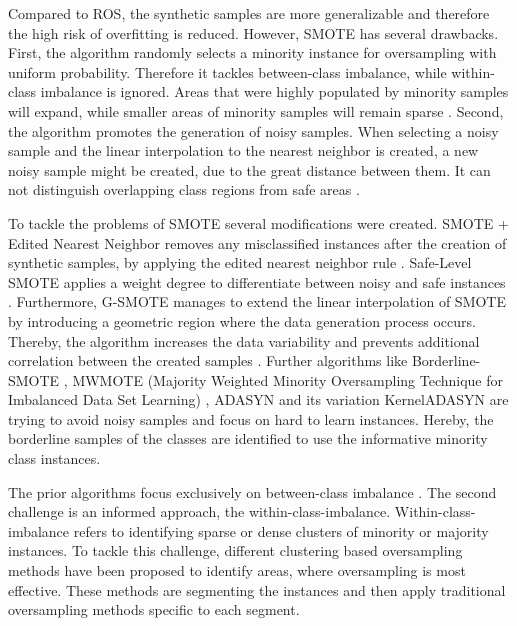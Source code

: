 \documentclass[parskip=full]{scrartcl}
\begin{document}
Compared to ROS, the synthetic samples are more generalizable and therefore the
high risk of overfitting is reduced. However, SMOTE has several drawbacks.
First, the algorithm randomly selects a minority instance for oversampling with
uniform probability. Therefore it tackles between-class imbalance, while
within-class imbalance is ignored. Areas that were highly populated by minority
samples will expand, while smaller areas of minority samples will remain sparse
\cite{Prati2004}. Second, the algorithm promotes the generation of noisy
samples. When selecting a noisy sample and the linear interpolation to the
nearest neighbor is created, a new noisy sample might be created, due to the
great distance between them. It can not distinguish overlapping class regions
from safe areas \cite{Bunkhumpornpat2009}. 

To tackle the problems of SMOTE several modifications were created. SMOTE +
Edited Nearest Neighbor removes any misclassified instances after the creation
of synthetic samples, by applying the edited nearest neighbor rule
\cite{Batista2004}. Safe-Level SMOTE applies a weight degree to differentiate
between noisy and safe instances \cite{Bunkhumpornpat2009}. Furthermore, G-SMOTE
manages to extend the linear interpolation of SMOTE by introducing a geometric
region where the data generation process occurs. Thereby, the algorithm
increases the data variability and prevents additional correlation between the
created samples \cite{Douzas2019}. Further algorithms like Borderline-SMOTE
\cite{Han2005}, MWMOTE (Majority Weighted Minority Oversampling Technique for
Imbalanced Data Set Learning) \cite{Barua2014}, ADASYN and its variation
KernelADASYN \cite{Tang2015} are trying to avoid noisy samples and focus on hard
to learn instances. Hereby, the borderline samples of the classes are identified
to use the informative minority class instances.

The prior algorithms focus exclusively on between-class imbalance
\cite{Nekooeimehr2016}. The second challenge is an informed approach, the
within-class-imbalance. Within-class-imbalance refers to identifying sparse or
dense clusters of minority or majority instances. To tackle this challenge,
different clustering based oversampling methods have been proposed to identify
areas, where oversampling is most effective. These methods are segmenting the
instances and then apply traditional oversampling methods specific to each
segment. 
\end{document}
